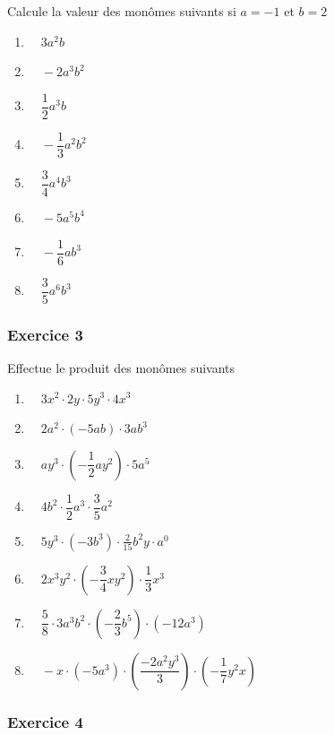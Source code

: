 \documentclass[
  12pt,
]{book}
\providecommand{\tightlist}{%
  \setlength{\itemsep}{0pt}\setlength{\parskip}{0pt}}
\begin{document}
Calcule la valeur des monômes suivants si \(a=-1\) et \(b=2\)

\begin{enumerate}
\def\labelenumi{\arabic{enumi}.}
\tightlist
\item
  \(\quad3a^2b\)
\item
  \(\quad-2a^3b^2\)
\item
  \(\quad\dfrac{1}{2}a^3b\)
\item
  \(\quad-\dfrac{1}{3}a^2b^2\)
\item
  \(\quad\dfrac{3}{4}a^4b^3\)
\item
  \(\quad-5a^5b^4\)
\item
  \(\quad-\dfrac{1}{6}ab^3\)
\item
  \(\quad\dfrac{3}{5}a^6b^3\)
\end{enumerate}

\hypertarget{exercice-3-2}{%
\subsubsection*{Exercice 3}\label{exercice-3-2}}

Effectue le produit des monômes suivants

\begin{enumerate}
\def\labelenumi{\arabic{enumi}.}
\tightlist
\item
  \(\quad 3x^2\cdot 2y \cdot 5y^3\cdot 4x^3\)
\item
  \(\quad 2a^2\cdot (-5ab)\cdot 3ab^3\)
\item
  \(\quad ay^3\cdot\left(-\dfrac{1}{2}ay^2\right)\cdot 5a^5\)
\item
  \(\quad 4b^2\cdot \dfrac{1}{2}a^3\cdot \dfrac{3}{5}a^2\)
\item
  \(\quad 5y^3\cdot(-3b^3)\cdot\frac{2}{15}b^2y\cdot a^0\)
\item
  \(\quad 2x^3y^2\cdot \left(-\dfrac{3}{4}xy^2\right)\cdot\dfrac{1}{3}x^3\)
\item
  \(\quad \dfrac{5}{8}\cdot 3a^3b^2\cdot\left(-\dfrac{2}{3}b^5\right)\cdot(-12a^3)\)
\item
  \(\quad -x\cdot (-5a^3)\cdot\left(\dfrac{-2a^2y^3}{3}\right)\cdot\left(-\dfrac{1}{7}y^2x\right)\)
\end{enumerate}

\hypertarget{exercice-4-2}{%
\subsubsection*{Exercice 4}\label{exercice-4-2}}
\end{document}
